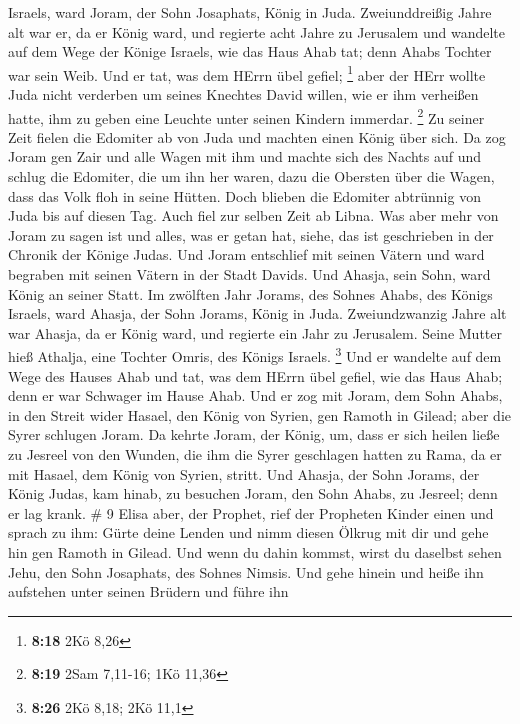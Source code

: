 Israels, ward Joram, der Sohn Josaphats, König in Juda. 
Zweiunddreißig Jahre alt war er, da er König ward, und regierte acht
Jahre zu Jerusalem  und wandelte auf dem Wege der Könige
Israels, wie das Haus Ahab tat; denn Ahabs Tochter war sein Weib. Und er
tat, was dem HErrn übel gefiel; \footnote{\textbf{8:18} 2Kö 8,26}
 aber der HErr wollte Juda nicht verderben um seines
Knechtes David willen, wie er ihm verheißen hatte, ihm zu geben eine
Leuchte unter seinen Kindern immerdar. \footnote{\textbf{8:19} 2Sam
  7,11-16; 1Kö 11,36}  Zu seiner Zeit fielen die Edomiter
ab von Juda und machten einen König über sich.  Da zog
Joram gen Zair und alle Wagen mit ihm und machte sich des Nachts auf und
schlug die Edomiter, die um ihn her waren, dazu die Obersten über die
Wagen, dass das Volk floh in seine Hütten.  Doch blieben
die Edomiter abtrünnig von Juda bis auf diesen Tag. Auch fiel zur selben
Zeit ab Libna.  Was aber mehr von Joram zu sagen ist und
alles, was er getan hat, siehe, das ist geschrieben in der Chronik der
Könige Judas.  Und Joram entschlief mit seinen Vätern und
ward begraben mit seinen Vätern in der Stadt Davids. Und Ahasja, sein
Sohn, ward König an seiner Statt.  Im zwölften Jahr Jorams,
des Sohnes Ahabs, des Königs Israels, ward Ahasja, der Sohn Jorams,
König in Juda.  Zweiundzwanzig Jahre alt war Ahasja, da er
König ward, und regierte ein Jahr zu Jerusalem. Seine Mutter hieß
Athalja, eine Tochter Omris, des Königs Israels. \footnote{\textbf{8:26}
  2Kö 8,18; 2Kö 11,1}  Und er wandelte auf dem Wege des
Hauses Ahab und tat, was dem HErrn übel gefiel, wie das Haus Ahab; denn
er war Schwager im Hause Ahab.  Und er zog mit Joram, dem
Sohn Ahabs, in den Streit wider Hasael, den König von Syrien, gen Ramoth
in Gilead; aber die Syrer schlugen Joram.  Da kehrte Joram,
der König, um, dass er sich heilen ließe zu Jesreel von den Wunden, die
ihm die Syrer geschlagen hatten zu Rama, da er mit Hasael, dem König von
Syrien, stritt. Und Ahasja, der Sohn Jorams, der König Judas, kam hinab,
zu besuchen Joram, den Sohn Ahabs, zu Jesreel; denn er lag krank. \# 9
 Elisa aber, der Prophet, rief der Propheten Kinder einen
und sprach zu ihm: Gürte deine Lenden und nimm diesen Ölkrug mit dir und
gehe hin gen Ramoth in Gilead.  Und wenn du dahin kommst,
wirst du daselbst sehen Jehu, den Sohn Josaphats, des Sohnes Nimsis. Und
gehe hinein und heiße ihn aufstehen unter seinen Brüdern und führe ihn
